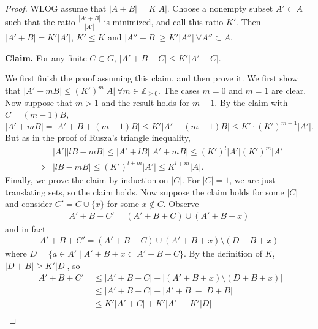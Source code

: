 \documentclass{article}
\theoremstyle{definition}
\begin{document}
\begin{proof}
    WLOG assume that $\left|A+B\right|=K\left|A\right|$. Choose a nonempty subset $A' \subset A$ such that the ratio $\frac{\left|A'+B\right|}{\left|A'\right|}$ is minimized, and call this ratio $K'$. Then $\left|A'+B\right|=K'\left|A'\right|$, $K'\le K$ and $\left|A''+B\right|\ge K'\left|A''\right| ~\forall A'' \subset A$.
    \vspace{1mm}
     
    \textbf{Claim.} For any finite $C \subset G$, $\left|A'+B+C\right|\le K'\left|A'+C\right|$.
    \vspace{1mm}
     
    We first finish the proof assuming this claim, and then prove it. We first show that $\left|A'+mB\right|\le (K')^m\left|A\right| ~\forall m \in \mathbb{Z}_{\ge 0}$. The cases $m=0$ and $m=1$ are clear. Now suppose that $m>1$ and the result holds for $m-1$. By the claim with $C=(m-1)B$, \[
    \left|A' + mB\right| = \left|A'+B+(m-1)B\right| \le K'\left|A'+(m-1)B\right|\le K'\cdot (K')^{m-1}\left|A'\right|.
    \]
    But as in the proof of Rusza's triangle inequality, 
    \begin{align*}
        &\left|A'\right|\left|lB-mB\right| \le \left|A' + lB\right|\left|A'+mB\right| \le (K')^l \left|A'\right|(K')^m \left|A'\right|\\
        \implies & \left|lB-mB\right|\le (K')^{l+m}\left|A'\right|\le K^{l+m}\left|A\right|.
    \end{align*}
    Finally, we prove the claim by induction on $\left|C\right|$. For $\left|C\right|=1$, we are just translating sets, so the claim holds. Now suppose the claim holds for some $\left|C\right|$ and consider $C' = C \cup \{x\}$ for some $x \not\in C$. Observe 
    \begin{align*}
        A'+B+C' = (A' + B + C) \cup (A'+B+x)
    \end{align*}
    and in fact 
    \begin{align*}
        A'+B+C' = (A'+B+C) \cup (A'+B+x) \setminus (D+B+x)
    \end{align*}
    where $D = \{a \in A' \mid A'+B+x \subset A'+B+C\}$. By the definition of $K$, $\left|D+B\right|\ge K'\left|D\right|$, so 
    \begin{align*}
        \left|A'+B+C'\right| &\le \left|A'+B+C\right|+\left|(A'+B+x)\setminus (D+B+x)\right| \\
        &\le \left|A'+B+C\right| + \left|A'+B\right| - \left|D+B\right|\\
        &\le K'\left|A'+C\right| + K'\left|A'\right| - K'\left|D\right|\\

\end{align*}
\end{proof}
\end{document}
